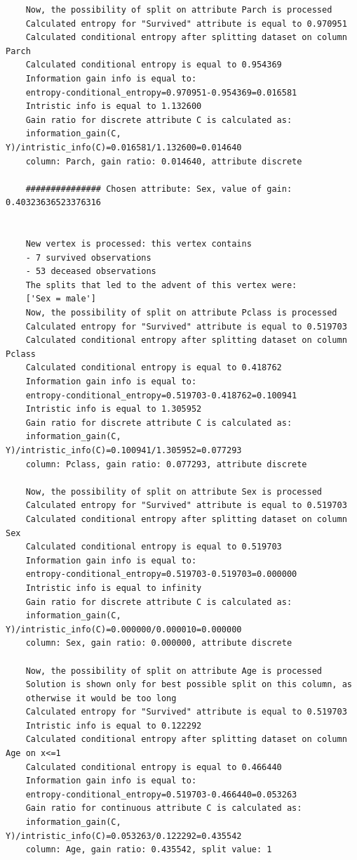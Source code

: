 \documentclass[12pt]{article}
\begin{document}
\begin{verbatim}
	Now, the possibility of split on attribute Parch is processed
	Calculated entropy for "Survived" attribute is equal to 0.970951
	Calculated conditional entropy after splitting dataset on column Parch
	Calculated conditional entropy is equal to 0.954369
	Information gain info is equal to:
	entropy-conditional_entropy=0.970951-0.954369=0.016581
	Intristic info is equal to 1.132600
	Gain ratio for discrete attribute C is calculated as:
	information_gain(C, Y)/intristic_info(C)=0.016581/1.132600=0.014640
	column: Parch, gain ratio: 0.014640, attribute discrete
	
	############### Chosen attribute: Sex, value of gain: 0.40323636523376316
	
	
	New vertex is processed: this vertex contains
	- 7 survived observations
	- 53 deceased observations
	The splits that led to the advent of this vertex were:
	['Sex = male']
	Now, the possibility of split on attribute Pclass is processed
	Calculated entropy for "Survived" attribute is equal to 0.519703
	Calculated conditional entropy after splitting dataset on column Pclass
	Calculated conditional entropy is equal to 0.418762
	Information gain info is equal to:
	entropy-conditional_entropy=0.519703-0.418762=0.100941
	Intristic info is equal to 1.305952
	Gain ratio for discrete attribute C is calculated as:
	information_gain(C, Y)/intristic_info(C)=0.100941/1.305952=0.077293
	column: Pclass, gain ratio: 0.077293, attribute discrete
	
	Now, the possibility of split on attribute Sex is processed
	Calculated entropy for "Survived" attribute is equal to 0.519703
	Calculated conditional entropy after splitting dataset on column Sex
	Calculated conditional entropy is equal to 0.519703
	Information gain info is equal to:
	entropy-conditional_entropy=0.519703-0.519703=0.000000
	Intristic info is equal to infinity
	Gain ratio for discrete attribute C is calculated as:
	information_gain(C, Y)/intristic_info(C)=0.000000/0.000010=0.000000
	column: Sex, gain ratio: 0.000000, attribute discrete
	
	Now, the possibility of split on attribute Age is processed
	Solution is shown only for best possible split on this column, as
	otherwise it would be too long
	Calculated entropy for "Survived" attribute is equal to 0.519703
	Intristic info is equal to 0.122292
	Calculated conditional entropy after splitting dataset on column Age on x<=1
	Calculated conditional entropy is equal to 0.466440
	Information gain info is equal to:
	entropy-conditional_entropy=0.519703-0.466440=0.053263
	Gain ratio for continuous attribute C is calculated as:
	information_gain(C, Y)/intristic_info(C)=0.053263/0.122292=0.435542
	column: Age, gain ratio: 0.435542, split value: 1
	

\end{verbatim}
\end{document}

